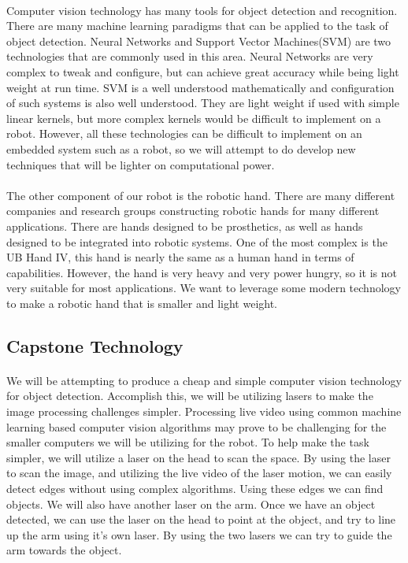 \documentclass[letterpaper]{article}
\begin{document}
\paragraph{} Computer vision technology has many tools for object detection and
recognition.  There are many machine learning paradigms that can be applied to
the task of object detection. Neural Networks and Support Vector Machines(SVM)
are two technologies that are commonly used in this area. Neural Networks are
very complex to tweak and configure, but can achieve great accuracy while being
light weight at run time. SVM is a well understood mathematically and
configuration of such systems is also well understood. They are light weight if
used with simple linear kernels, but more complex kernels would be difficult to
implement on a robot\cite{SVMStackOverflow}. However, all these technologies
can be difficult to implement on an embedded system such as a robot, so we will
attempt to do develop new techniques that will be lighter on computational
power.

\paragraph{} The other component of our robot is the robotic hand. There are
many different companies and research groups constructing robotic hands for
many different applications. There are hands designed to be prosthetics, as
well as hands designed to be integrated into robotic systems. One of the most
complex is the UB Hand IV, this hand is nearly the same as a human hand in
terms of capabilities. However, the hand is very heavy and very power hungry,
so it is not very suitable for most applications\cite{Melchiorri2013}. We want
to leverage some modern technology to make a robotic hand that is smaller and
light weight.

\subsection{Capstone Technology} \paragraph{} We will be attempting to produce
a cheap and simple computer vision technology for object detection. Accomplish
this, we will be utilizing lasers to make the image processing challenges
simpler. Processing live video using common machine learning based computer
vision algorithms may prove to be challenging for the smaller computers we will
be utilizing for the robot. To help make the task simpler, we will utilize a
laser on the head to scan the space. By using the laser to scan the image, and
utilizing the live video of the laser motion, we can easily detect edges
without using complex algorithms. Using these edges we can find objects. We
will also have another laser on the arm. Once we have an object detected, we
can use the laser on the head to point at the object, and try to line up the
arm using it's own laser. By using the two lasers we can try to guide the arm
towards the object.
\end{document}

